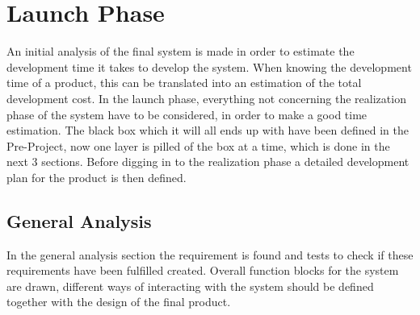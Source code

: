 \chapter{Launch Phase}
An initial analysis of the final system is made in order to estimate the development time it takes to develop the system. When knowing the development time of a product, this can be translated into an estimation of the total development cost. In the launch phase, everything not concerning the realization phase of the system have to be considered, in order to make a good time estimation. The black box which it will all ends up with have been defined in the Pre-Project, now one layer is pilled of the box at a time, which is done in the next 3 sections. Before digging in to the realization phase a detailed development plan for the product is then defined. 
\section{General Analysis}
In the general analysis section the requirement is found and tests to check if these requirements have been fulfilled created. Overall function blocks for the system are drawn, different ways of interacting with the system should be defined together with the design of the final product.
 
